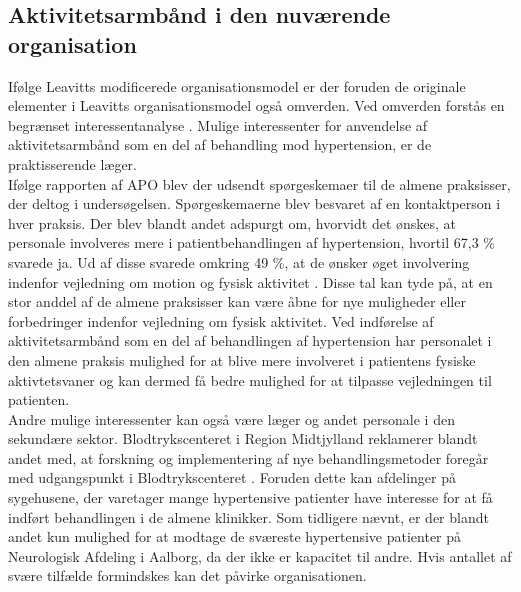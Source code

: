 \subsection{Aktivitetsarmbånd i den nuværende organisation}
Ifølge Leavitts modificerede organisationsmodel er der foruden de originale elementer i Leavitts organisationsmodel også omverden. Ved omverden forstås en begrænset interessentanalyse \citep{mtvhaandbog}. Mulige interessenter for anvendelse af aktivitetsarmbånd som en del af behandling mod hypertension, er de praktisserende læger. \\
Ifølge rapporten af APO blev der udsendt spørgeskemaer til de almene praksisser, der deltog i undersøgelsen. Spørgeskemaerne blev besvaret af en kontaktperson i hver praksis. Der blev blandt andet adspurgt om, hvorvidt det ønskes, at personale involveres mere i patientbehandlingen af hypertension, hvortil 67,3 \% svarede ja. Ud af disse svarede omkring 49 \%, at de ønsker øget involvering indenfor vejledning om motion og fysisk aktivitet \citep{munck2007}. Disse tal kan tyde på, at en stor anddel af de almene praksisser kan være åbne for nye muligheder eller forbedringer indenfor vejledning om fysisk aktivitet. Ved indførelse af aktivitetsarmbånd som en del af behandlingen af hypertension har personalet i den almene praksis mulighed for at blive mere involveret i patientens fysiske aktivtetsvaner og kan dermed få bedre mulighed for at tilpasse vejledningen til patienten. 
\\
Andre mulige interessenter kan også være læger og andet personale i den sekundære sektor. Blodtrykscenteret i Region Midtjylland reklamerer blandt andet med, at forskning og implementering af nye behandlingsmetoder foregår med udgangspunkt i Blodtrykscenteret \citep{aarhusuniversitetshospital}. Foruden dette kan afdelinger på sygehusene, der varetager mange hypertensive patienter have interesse for at få indført behandlingen i de almene klinikker. Som tidligere nævnt, er der blandt andet kun mulighed for at modtage de sværeste hypertensive patienter på Neurologisk Afdeling i Aalborg, da der ikke er kapacitet til andre. Hvis antallet af svære tilfælde formindskes kan det påvirke organisationen. 



